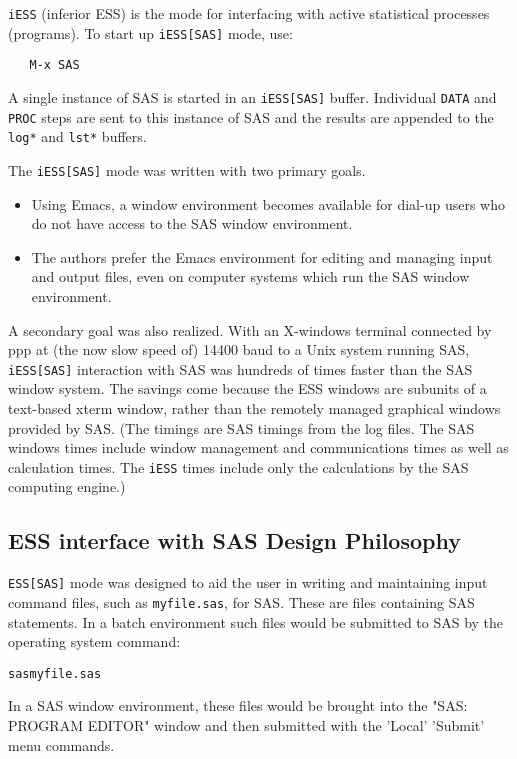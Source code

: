 \documentclass{article}
\newenvironment{Salltt}{\small\begin{alltt}}{\end{alltt}}
\begin{document}
{\tt iESS} (inferior ESS) is the mode for interfacing with active
statistical processes (programs).  To start up {\tt iESS[SAS]} mode, use:
\begin{verbatim}
   M-x SAS
\end{verbatim}   
A single instance of SAS is started in an {\tt iESS[SAS]} buffer.  Individual
{\tt DATA} and {\tt PROC} steps are sent to this instance of SAS and the results
are appended to the {\tt *log*} and {\tt *lst*} buffers.

The {\tt iESS[SAS]} mode was written with two primary goals.
\begin{itemize}
\item Using Emacs, a window environment becomes available for dial-up
  users who do not have access to the SAS window environment.
\item The authors prefer the Emacs environment for editing and
  managing input and output files, even on computer systems which run
  the SAS window environment.
\end{itemize}
A secondary goal was also realized.  With an X-windows
terminal connected by ppp at (the now slow speed of)
14400 baud to a Unix system running SAS,
{\tt iESS[SAS]} interaction with SAS was hundreds of times faster than the
SAS window system.  The savings come because the ESS windows are
subunits of a text-based xterm window, rather than the remotely
managed graphical windows provided by SAS.  (The timings are SAS
timings from the log files.  The SAS windows times include window
management and communications times as well as calculation times.  The
{\tt iESS} times include only the calculations by the SAS computing engine.)


\subsection{ESS interface with SAS Design Philosophy}
\label{sec:SAS:phil}

{\tt ESS[SAS]} mode was designed to aid the user in writing and maintaining
input command files, such as {\tt myfile.sas}, for SAS.  These are files
containing SAS statements.  In a batch environment such files would be
submitted to SAS by the operating system command:
\begin{Salltt}
  sas myfile.sas
\end{Salltt}
In a SAS window environment, these files would be brought into the
"SAS: PROGRAM EDITOR" window and then submitted with the 'Local' 'Submit'
menu commands.
\end{document}
